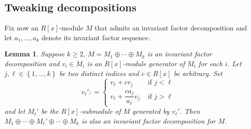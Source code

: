 \documentclass[11pt]{article}
\newtheorem{lemma}[theo]{Lemma}
\theoremstyle{definition}
\numberwithin{equation}{section}
\begin{document}
\subsection{Tweaking  decompositions}   Fix now  an $R[x]$-module $ M$  that admits an invariant factor decomposition and let $ a_{1}, \ldots, a_{k} $ denote  its invariant factor sequence.    
\begin{lemma} \label{tweak}    Suppose $k \geq 2$, $ M =  M_{1} \oplus \cdots \oplus M_{k} $ is an invariant factor decomposition and $v_i \in M_i$ is an $R[x]$-module generator of $M_i$ for each $i$.   Let $ j , \ell  \in \left \{1, \ldots , k \right \} $ be two distinct  indices  and $ c \in R[x] $ be arbitrary.  Set $$   v_{\ell} '  :    =  \begin{cases} v_{\ell} + c v_{j} & \text{ if } j < \ell \\[0.5em]    
v_{\ell}  + \dfrac{ c  a_{j}}   {  a_{\ell}    }      v_{j}  & \text{ if } j > \ell 
\end{cases}  
$$  
and let $ M_{\ell} ' $ be the $R[x] $-submodule of  $ M $  generated by $ v_{\ell} ' $. Then $ M_{1} \oplus \cdots \oplus M_{\ell}' \oplus \cdots \oplus M_{k}  $ is also an  invariant factor decomposition for $ M $.    
\end{lemma}       
\end{document}
